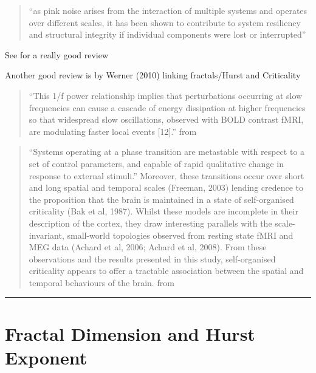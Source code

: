 \documentclass[
  sn-vancouver,
  Numbered,
  referee,
  lineno]{sn-jnl}
\begin{document}
\begin{quote}
``as pink noise arises from the interaction of multiple systems and
operates over different scales, it has been shown to contribute to
system resiliency and structural integrity if individual components were
lost or interrupted''
\citep{lipsitzLossComplexityAging1992, lipsitzDynamicsStabilityPhysiologic2002}
\end{quote}

See \citet{hermanFractalCharacterizationComplexity2009} for a really
good review

Another good review is by Werner (2010) linking fractals/Hurst and
Criticality \citet{wernerFractalsNervousSystem2010}

\begin{quote}
``This 1/f power relationship implies that perturbations occurring at
slow frequencies can cause a cascade of energy dissipation at higher
frequencies so that widespread slow oscillations, observed with BOLD
contrast fMRI, are modulating faster local events {[}12{]}.'' from
\citet{barnesEndogenousHumanBrain2009}
\end{quote}

\begin{quote}
``Systems operating at a phase transition are metastable with respect to
a set of control parameters, and capable of rapid qualitative change in
response to external stimuli.'' Moreover, these transitions occur over
short and long spatial and temporal scales (Freeman, 2003) lending
credence to the proposition that the brain is maintained in a state of
self-organised criticality (Bak et al, 1987). Whilst these models are
incomplete in their description of the cortex, they draw interesting
parallels with the scale-invariant, small-world topologies observed from
resting state fMRI and MEG data (Achard et al, 2006; Achard et al,
2008). From these observations and the results presented in this study,
self-organised criticality appears to offer a tractable association
between the spatial and temporal behaviours of the brain. from
\citet{sucklingEndogenousMultifractalBrain2008}
\end{quote}

\begin{center}\rule{0.5\linewidth}{0.5pt}\end{center}

\section{Fractal Dimension and Hurst
Exponent}\label{fractal-dimension-and-hurst-exponent}
\end{document}
